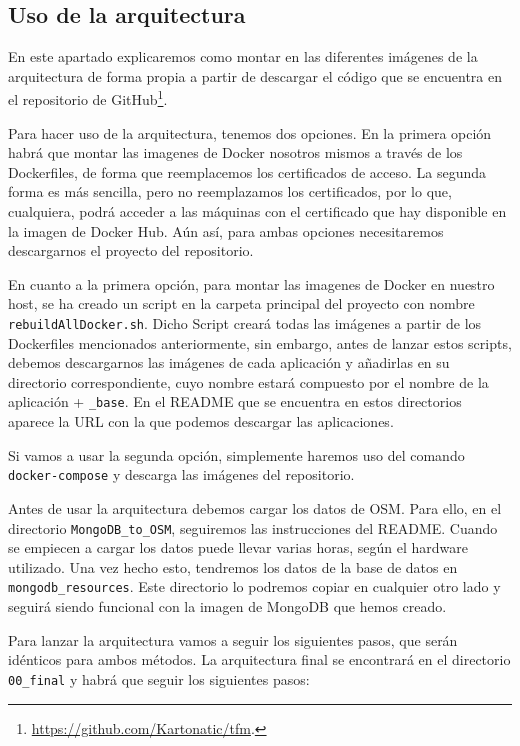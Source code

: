 \subsection{Uso de la arquitectura\label{uso}}

En este apartado explicaremos como montar en las diferentes imágenes de la
arquitectura de forma propia a partir de descargar el código que se
encuentra en el repositorio de
GitHub\footnote{\url{https://github.com/Kartonatic/tfm}.}.

Para hacer uso de la arquitectura, tenemos dos opciones. En la primera
opción habrá que montar las imagenes de Docker nosotros mismos a través de
los Dockerfiles, de forma que reemplacemos los certificados de acceso. La
segunda forma es más sencilla, pero no reemplazamos los certificados, por
lo que, cualquiera, podrá acceder a las máquinas con el certificado que hay
disponible en la imagen de Docker Hub. Aún así, para ambas opciones
necesitaremos descargarnos el proyecto del repositorio.

En cuanto a la primera opción, para montar las imagenes de Docker en
nuestro host, se ha creado un script en la carpeta principal del proyecto
con nombre {\tt rebuildAllDocker.sh}. Dicho Script creará todas las
imágenes a partir de los Dockerfiles mencionados anteriormente, sin
embargo, antes de lanzar estos scripts, debemos descargarnos las imágenes
de cada aplicación y añadirlas en su directorio correspondiente, cuyo
nombre estará compuesto por el nombre de la aplicación + {\tt \_base}. En
el README que se encuentra en estos directorios aparece la URL con la que
podemos descargar las aplicaciones.

Si vamos a usar la segunda opción, simplemente haremos uso del comando {\tt
  docker-compose} y descarga las imágenes del repositorio.

Antes de usar la arquitectura debemos cargar los datos de OSM. Para ello,
en el directorio {\tt MongoDB\_to\_OSM}, seguiremos las instrucciones del
README. Cuando se empiecen a cargar los datos puede llevar varias horas,
según el hardware utilizado. Una vez hecho esto, tendremos los datos de la
base de datos en {\tt mongodb\_resources}. Este directorio lo podremos
copiar en cualquier otro lado y seguirá siendo funcional con la imagen de
MongoDB que hemos creado.

Para lanzar la arquitectura vamos a seguir los siguientes pasos, que serán
idénticos para ambos métodos. La arquitectura final se encontrará en el
directorio {\tt 00\_final} y habrá que seguir los siguientes pasos:

